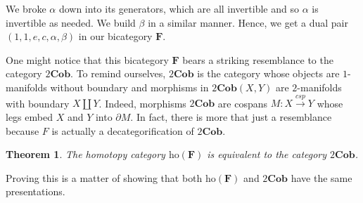 \documentclass[11pt]{amsart}
\newcommand{\cat}[1]{\mathbf{#1}}
\newcommand{\from}{\colon}
\newcommand{\tocospan}{\xrightarrow{\mathit{csp}}}
\newtheorem{thm}{Theorem}[section]
\theoremstyle{remark}
\theoremstyle{definition}
\begin{document}
We broke $\alpha$ down into its generators, which are all invertible and so $\alpha$ is invertible as needed.  We build $\beta$ in a similar manner.  Hence, we get a dual pair $(1,1,e,c,\alpha,\beta)$ in our bicategory $\cat{F}$.  

One might notice that this bicategory $\cat{F}$ bears a striking resemblance to the category $2\cat{Cob}$.  To remind ourselves, $2\cat{Cob}$ is the category whose objects are $1$-manifolds without boundary and morphisms in $2\cat{Cob}(X,Y)$ are $2$-manifolds with boundary $X \coprod Y$.  Indeed, morphisms $2\cat{Cob}$ are cospans $M \from X \tocospan Y$ whose legs embed $X$ and $Y$ into $\partial M$.  In fact, there is more that just a resemblance because $F$ is actually a decategorification of $2\cat{Cob}$.  

\begin{thm}
	The homotopy category $\text{ho}(\cat{F})$ is equivalent to the category $2\cat{Cob}$. 
\end{thm}

Proving this is a matter of showing that both $\text{ho}(\cat{F})$ and $2\cat{Cob}$ have the same presentations.  

%
%
\end{document}
